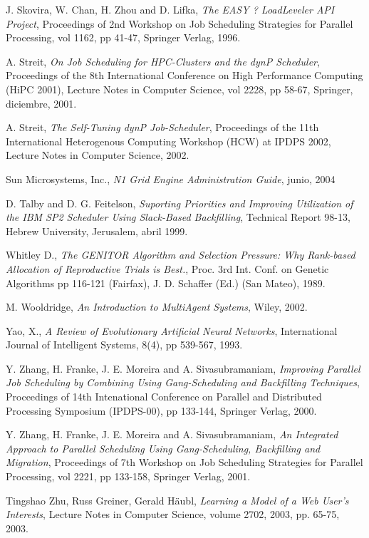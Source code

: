 \begin{thebibliography}{999}
J. Skovira, W. Chan, H. Zhou and D. Lifka, 
{\it The EASY ? LoadLeveler API Project}, 
Proceedings of 2nd Workshop on Job Scheduling Strategies for Parallel Processing, 
vol 1162, pp 41-47, Springer Verlag, 1996.

A. Streit, {\it On Job Scheduling for HPC-Clusters and the dynP Scheduler}, Proceedings of the 8th International Conference on High Performance Computing (HiPC 2001), Lecture Notes in Computer Science, vol 2228, pp 58-67, Springer, diciembre, 2001.

A. Streit, {\it The Self-Tuning dynP Job-Scheduler}, Proceedings of the 11th International Heterogenous Computing Workshop (HCW) at IPDPS 2002, Lecture Notes in Computer Science, 2002.

Sun Microsystems, Inc.,
{\it N1 Grid Engine Administration Guide}, junio, 2004

D. Talby and D. G. Feitelson, 
{\it Suporting Priorities and Improving Utilization of the IBM SP2 Scheduler Using Slack-Based Backfilling}, 
Technical Report 98-13, Hebrew University, Jerusalem, abril 1999.

Whitley D., 
{\it The GENITOR Algorithm and Selection Pressure: Why Rank-based Allocation of Reproductive Trials is Best.}, Proc. 3rd Int. Conf. on Genetic Algorithms pp 116-121 (Fairfax), J. D. Schaffer (Ed.) (San Mateo), 1989.

M. Wooldridge, {\it An Introduction to MultiAgent Systems}, Wiley, 2002.

Yao, X., {\it A Review of Evolutionary Artificial Neural Networks}, International Journal of Intelligent Systems, 8(4), pp 539-567, 1993.

Y. Zhang, H. Franke, J. E. Moreira and A. Sivasubramaniam, 
{\it Improving Parallel Job Scheduling by Combining Using Gang-Scheduling and 
Backfilling Techniques}, 
Proceedings of 14th Intenational Conference on Parallel and Distributed Processing Symposium (IPDPS-00), pp 133-144, Springer Verlag, 2000.

Y. Zhang, H. Franke, J. E. Moreira and A. Sivasubramaniam, 
{\it An Integrated Approach to Parallel Scheduling Using Gang-Scheduling, Backfilling and Migration}, 
Proceedings of 7th Workshop on Job Scheduling Strategies for Parallel Processing, 
vol 2221, pp 133-158, Springer Verlag, 2001.

Tingshao Zhu, Russ Greiner, Gerald Häubl, {\it Learning a Model of a Web User's Interests}, Lecture Notes in Computer Science, volume 2702, 2003, pp. 65-75, 2003.


\end{thebibliography}
